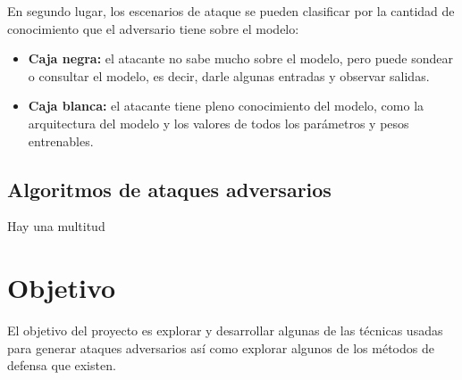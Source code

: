 \documentclass[10pt]{article}
\begin{document}
\begin{multicols*}{2}
En segundo lugar, los escenarios de ataque se pueden clasificar por la cantidad de conocimiento que el adversario tiene sobre el modelo:

\begin{itemize}
\item \textbf{Caja negra:} el atacante no sabe mucho sobre el modelo, pero puede sondear o consultar el modelo, es decir, darle algunas entradas y observar salidas.

\item \textbf{Caja blanca:} el atacante tiene pleno conocimiento del modelo, como la arquitectura del modelo y los valores de todos los parámetros y pesos entrenables.
\end{itemize}

\subsection{Algoritmos de ataques adversarios}

Hay una multitud \cite{OnePixel}

\section{Objetivo}

El objetivo del proyecto es explorar y desarrollar algunas de las técnicas usadas para generar ataques adversarios así como explorar algunos de los métodos de defensa que existen.




\end{multicols*}
\end{document}
